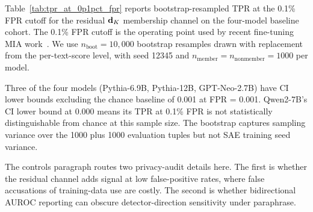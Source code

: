 Table~\ref{tab:tpr_at_0p1pct_fpr} reports bootstrap-resampled TPR at the 0.1\% FPR cutoff for the residual $\dK$ membership channel on the four-model baseline cohort. The 0.1\% FPR cutoff is the operating point used by recent fine-tuning MIA work~\citep{chen2026wbc, ilic2026ezmia}. We use $n_{\mathrm{boot}}=10{,}000$ bootstrap resamples drawn with replacement from the per-text-score level, with seed 12345 and $n_{\mathrm{member}}=n_{\mathrm{nonmember}}=1000$ per model.

\begin{table}[!htbp]
\centering
\caption{TPR at 0.1\% FPR for residual $\dK$ across four models. Point estimates and bootstrap 95\% CIs from $n_{\mathrm{boot}}=10{,}000$ resamples. Pythia-12B has the highest point estimate at low FPR, with overlapping bootstrap CIs across the three non-Qwen2 models. Qwen2-7B is not statistically distinguishable from chance at this sample size, consistent with Qwen2's weak architectural replication of the dark-subspace effect documented in Appendix~\ref{app:qwen2_pilot}.}
\label{tab:tpr_at_0p1pct_fpr}
\end{table}

Three of the four models (Pythia-6.9B, Pythia-12B, GPT-Neo-2.7B) have CI lower bounds excluding the chance baseline of 0.001 at FPR = 0.001. Qwen2-7B's CI lower bound at 0.000 means its TPR at 0.1\% FPR is not statistically distinguishable from chance at this sample size. The bootstrap captures sampling variance over the 1000 plus 1000 evaluation tuples but not SAE training seed variance.

The controls paragraph routes two privacy-audit details here. The first is whether the residual channel adds signal at low false-positive rates, where false accusations of training-data use are costly. The second is whether bidirectional AUROC reporting can obscure detector-direction sensitivity under paraphrase.

